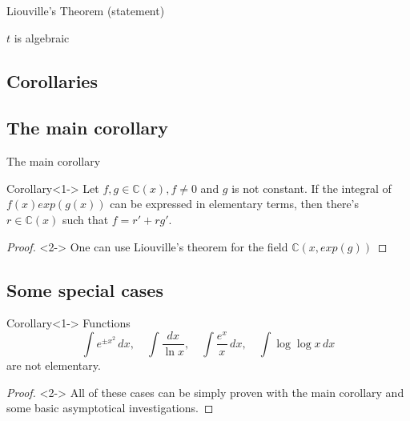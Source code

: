 \documentclass[8pt]{beamer}
\renewcommand{\C}{\ensuremath{\mathbb{C}}}
\renewcommand{\|}{\ensuremath{\hspace{0.1cm} | \hspace{0.1cm}}}
\begin{document}
\begin{section}{Liouville's Theorem (statement)}
\begin{frame}{$t$ is algebraic}

    \end{frame}

    \section{Corollaries}
    \subsection{The main corollary}
    \begin{frame}{The main corollary}
        \begin{block}{Corollary}<1->
            Let $f, g \in \C(x), f\neq 0$ and $g$ is not constant. 
            If the integral of $f(x) exp(g(x))$ can be expressed in elementary terms, then there's $r\in \C(x)$ such that $f = r' + rg'$.
        \end{block}
        \begin{proof}<2->
            One can use Liouville's theorem for the field $\C(x, exp(g))$
        \end{proof}
    \end{frame}
    
    \subsection{Some special cases}
    \begin{frame}
        \begin{block}{Corollary}<1->
            Functions
            \[
                \int e^{\pm x^2} \, dx, \quad \int \frac{dx}{\ln x}, \quad \int \frac{e^x}{x} \, dx, \quad \int \log \log x \, dx
            \]
            are not elementary.
        \end{block}
        
        \begin{proof}<2->
            All of these cases can be simply proven with the main corollary and some basic asymptotical investigations.
        \end{proof}


\end{frame}
\end{section}
\end{document}

